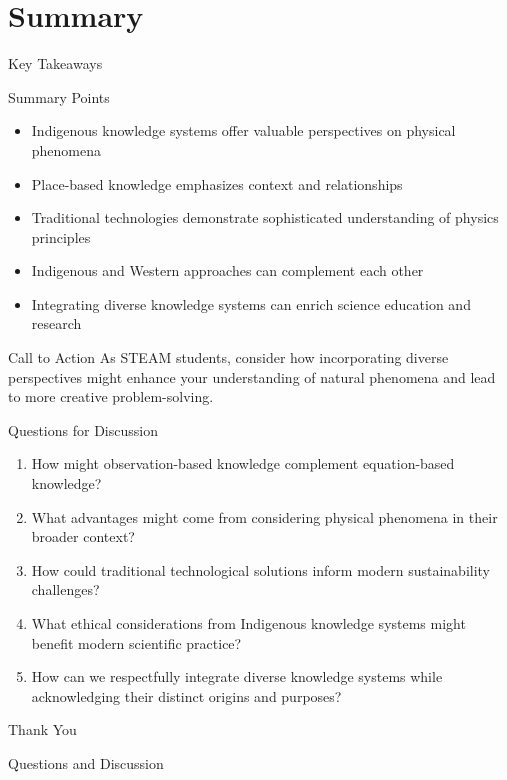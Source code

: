 \documentclass{beamer}
\begin{document}
\section{Summary}

\begin{frame}{Key Takeaways}
    \begin{block}{Summary Points}
        \begin{itemize}
            \item Indigenous knowledge systems offer valuable perspectives on physical phenomena
            \item Place-based knowledge emphasizes context and relationships
            \item Traditional technologies demonstrate sophisticated understanding of physics principles
            \item Indigenous and Western approaches can complement each other
            \item Integrating diverse knowledge systems can enrich science education and research
        \end{itemize}
    \end{block}
    
    \begin{alertblock}{Call to Action}
        As STEAM students, consider how incorporating diverse perspectives might enhance your understanding of natural phenomena and lead to more creative problem-solving.
    \end{alertblock}
\end{frame}

\begin{frame}{Questions for Discussion}
    \begin{enumerate}
        \item How might observation-based knowledge complement equation-based knowledge?
        \item What advantages might come from considering physical phenomena in their broader context?
        \item How could traditional technological solutions inform modern sustainability challenges?
        \item What ethical considerations from Indigenous knowledge systems might benefit modern scientific practice?
        \item How can we respectfully integrate diverse knowledge systems while acknowledging their distinct origins and purposes?
    \end{enumerate}
\end{frame}

\begin{frame}
    \begin{center}
        \Huge\textcolor{ds9blue}{Thank You}
        
        \vspace{1cm}
        
        \large Questions and Discussion
    \end{center}
\end{frame}
\end{document}
